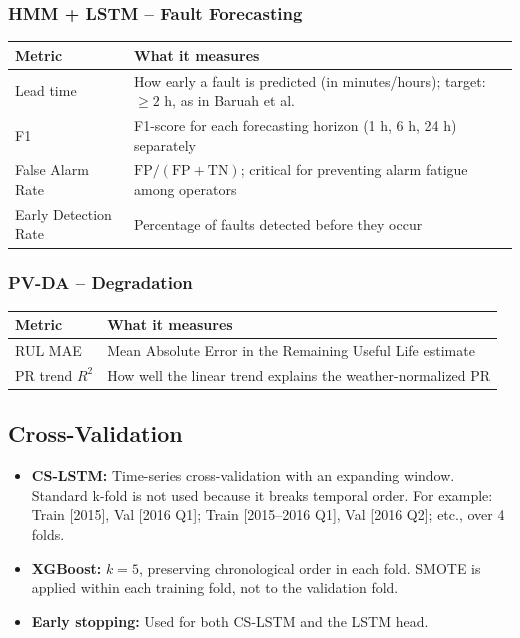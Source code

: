 \documentclass[11pt,a4paper]{article}
\begin{document}
\subsubsection*{HMM + LSTM -- Fault Forecasting}
\begin{tabularx}{\textwidth}{@{}p{}Y@{}}
\hline
\textbf{Metric} & \textbf{What it measures} \\
\hline
Lead time & How early a fault is predicted (in minutes/hours); target: $\geq 2$ h, as in Baruah et al. \\
F1 & F1-score for each forecasting horizon (1 h, 6 h, 24 h) separately \\
False Alarm Rate & $\mathrm{FP}/(\mathrm{FP}+\mathrm{TN})$; critical for preventing alarm fatigue among operators \\
Early Detection Rate & Percentage of faults detected before they occur \\
\hline
\end{tabularx}

\subsubsection*{PV-DA -- Degradation}
\begin{tabularx}{\textwidth}{@{}p{}Y@{}}
\hline
\textbf{Metric} & \textbf{What it measures} \\
\hline
RUL MAE & Mean Absolute Error in the Remaining Useful Life estimate \\
PR trend $R^2$ & How well the linear trend explains the weather-normalized PR \\
\hline
\end{tabularx}

\subsection*{Cross-Validation}
\begin{itemize}
    \item \textbf{CS-LSTM:} Time-series cross-validation with an expanding window. Standard k-fold is not used because it breaks temporal order. For example: Train [2015], Val [2016 Q1]; Train [2015--2016 Q1], Val [2016 Q2]; etc., over 4 folds.
    \item \textbf{XGBoost:} $k=5$, preserving chronological order in each fold. SMOTE is applied within each training fold, not to the validation fold.
    \item \textbf{Early stopping:} Used for both CS-LSTM and the LSTM head.
\end{itemize}
\end{document}
